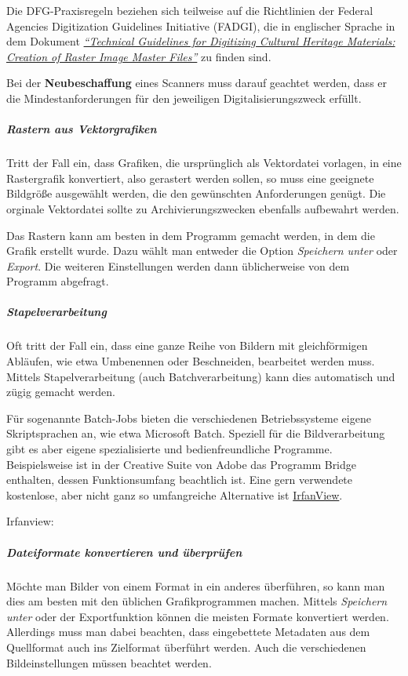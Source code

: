 Die DFG-Praxisregeln beziehen sich teilweise auf die Richtlinien der Federal Agencies Digitization Guidelines Initiative (FADGI), die in englischer Sprache in dem Dokument \href{http://www.digitizationguidelines.gov/guidelines/FADGI_Still_Image-Tech_Guidelines_2010-08-24.pdf}{\emph{"`Technical Guidelines for Digitizing Cultural Heritage Materials: Creation of Raster Image Master Files"'}} zu finden sind.

Bei der {\bfseries Neubeschaffung} eines Scanners muss darauf geachtet werden, dass er die Mindestanforderungen für den jeweiligen Digitalisierungszweck erfüllt.

\subparagraph{Rastern aus Vektorgrafiken} Tritt der Fall ein, dass Grafiken, die ursprünglich als Vektordatei vorlagen, in eine Rastergrafik konvertiert, also gerastert werden sollen, so muss eine geeignete Bildgröße ausgewählt werden, die den gewünschten Anforderungen genügt. Die orginale Vektordatei sollte zu Archivierungszwecken ebenfalls aufbewahrt werden. 

Das Rastern kann am besten in dem Programm gemacht werden, in dem die Grafik erstellt wurde. Dazu wählt man entweder die Option \emph{Speichern unter} oder \emph{Export}. Die weiteren Einstellungen werden dann üblicherweise von dem Programm abgefragt.

\subparagraph{Stapelverarbeitung}
Oft tritt der Fall ein, dass eine ganze Reihe von Bildern mit gleichförmigen Abläufen, wie etwa Umbenennen oder Beschneiden, bearbeitet werden muss. Mittels Stapelverarbeitung (auch Batchverarbeitung) kann dies automatisch und zügig gemacht werden. 

Für sogenannte Batch-Jobs bieten die verschiedenen Betriebssysteme eigene Skriptsprachen an, wie etwa Microsoft Batch. Speziell für die Bildverarbeitung gibt es aber eigene spezialisierte und bedienfreundliche Programme. Beispielsweise ist in der Creative Suite von Adobe das Programm Bridge enthalten, dessen Funktionsumfang beachtlich ist. Eine gern verwendete kostenlose, aber nicht ganz so umfangreiche Alternative ist \href{http://www.irfanview.de/}{IrfanView}.

\begin{flushleft}
	Irfanview: 
\end{flushleft}

\subparagraph{Dateiformate konvertieren und überprüfen} 
Möchte man Bilder von einem Format in ein anderes überführen, so kann man dies am besten mit den üblichen Grafikprogrammen machen. Mittels \emph{Speichern unter} oder der Exportfunktion können die meisten Formate konvertiert werden. Allerdings muss man dabei beachten, dass eingebettete Metadaten aus dem Quellformat auch ins Zielformat überführt werden. Auch die verschiedenen Bildeinstellungen müssen beachtet werden.

